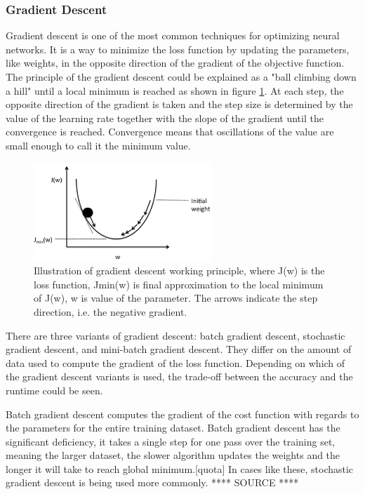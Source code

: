 \subsubsection{Gradient Descent}
Gradient descent is one of the most common techniques for optimizing neural networks. It is a way to minimize the loss function by updating the parameters, like weights, in the opposite direction of the gradient of the objective function.\citep{Ruder2016} The principle of the gradient descent could be explained as a "ball climbing down a hill" until a local minimum is reached as shown in figure \ref{fig:GDgraph}. At each step, the opposite direction of the gradient is taken and the step size is determined by the value of the learning rate together with the slope of the gradient until the convergence is reached. Convergence means that oscillations of the value are small enough to call it the minimum value.\citep{Raschka2016}

\begin{figure} [H]
\centering
\includegraphics[width=0.6\textwidth]{figures/GDgraph}
\caption{Illustration of gradient descent working principle, where J(w) is the loss function, Jmin(w) is final approximation to the local minimum of J(w), w is value of the parameter. The arrows indicate the step direction, i.e. the negative gradient.\citep{Raschka2016}}
\label{fig:GDgraph}  
\end{figure}

\noindent
There are three variants of gradient descent: batch gradient descent, stochastic gradient descent, and mini-batch gradient descent. They differ on the amount of data used to compute the gradient of the loss function. Depending on which of the gradient descent variants is used, the trade-off between the accuracy and the runtime could be seen.

\noindent
Batch gradient descent computes the gradient of the cost function with regards to the parameters for the entire training dataset.\citep{Ruder2016} Batch gradient descent has the significant deficiency, it takes a single step for one pass over the training set, meaning the larger dataset, the slower algorithm updates the weights and the longer it will take to reach global minimum.[quota] In cases like these, stochastic gradient descent is being used more commonly. **** SOURCE ****


